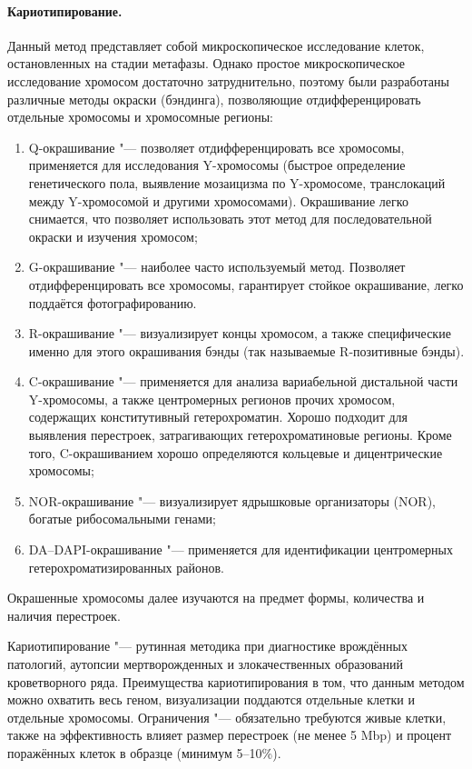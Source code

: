 \documentclass[a4paper,12pt]{article}
\begin{document}
\paragraph{Кариотипирование.}
Данный метод представляет собой микроскопическое исследование клеток, остановленных на стадии метафазы.
Однако простое микроскопическое исследование хромосом достаточно затруднительно, поэтому были разработаны различные методы окраски (бэндинга), позволяющие отдифференцировать отдельные хромосомы и хромосомные регионы\cite{schreck}:

\begin{enumerate}
\item Q-окрашивание "--- позволяет отдифференцировать все хромосомы, применяется для исследования Y-хромосомы (быстрое определение генетического пола, выявление мозаицизма по Y-хромосоме, транслокаций между Y-хромосомой и другими хромосомами).
Окрашивание легко снимается, что позволяет использовать этот метод для последовательной окраски и изучения хромосом;
\item G-окрашивание "--- наиболее часто используемый метод.
Позволяет отдифференцировать все хромосомы, гарантирует стойкое окрашивание, легко поддаётся фотографированию.
\item R-окрашивание "--- визуализирует концы хромосом, а также специфические именно для этого окрашивания бэнды (так называемые R-позитивные бэнды).
\item C-окрашивание "--- применяется для анализа вариабельной дистальной части Y-хромосомы, а также центромерных регионов прочих хромосом, содержащих конститутивный гетерохроматин.
Хорошо подходит для выявления перестроек, затрагивающих гетерохроматиновые регионы.
Кроме того, C-окрашиванием хорошо определяются кольцевые и дицентрические хромосомы;
\item NOR-окрашивание "--- визуализирует ядрышковые организаторы (NOR), богатые рибосомальными генами;
\item DA--DAPI-окрашивание "--- применяется для идентификации центромерных гетерохроматизированных районов.
\end{enumerate}

Окрашенные хромосомы далее изучаются на предмет формы, количества и наличия перестроек.

Кариотипирование "--- рутинная методика при диагностике врождённых патологий, аутопсии мертворожденных и злокачественных образований кроветворного ряда.
Преимущества кариотипирования в том, что данным методом можно охватить весь геном, визуализации поддаются отдельные клетки и отдельные хромосомы.
Ограничения "--- обязательно требуются живые клетки, также на эффективность влияет размер перестроек (не менее 5 Mbp) и процент поражённых клеток в образце (минимум 5--10\%)\cite{sampson}.
\end{document}

